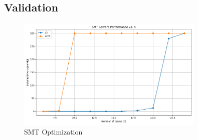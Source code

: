 \subsection{Validation}

\begin{figure}[h!]
  \centering
  \includegraphics[width=0.8\textwidth]{img/SMT-result.png}
  \caption{SMT Optimization}
  \label{fig:output}
\end{figure}
